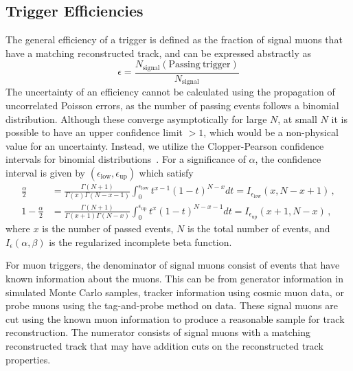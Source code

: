 \subsection{Trigger Efficiencies} \label{sec:kmtf_eff}
The general efficiency of a trigger is defined as the fraction of signal muons that have a matching reconstructed track, and can be expressed abstractly as
\begin{equation}\label{eq:eff}
	\epsilon=\frac{N_\mathrm{signal}(\mathrm{Passing\ trigger})}{N_\mathrm{signal}}	
\end{equation}
The uncertainty of an efficiency cannot be calculated using the propagation of uncorrelated Poisson errors, as the number of passing events follows a binomial distribution. Although these converge asymptotically for large $N$, at small $N$ it is possible to have an upper confidence limit $>1$, which would be a non-physical value for an uncertainty. Instead, we utilize the Clopper-Pearson confidence intervals for binomial distributions~\cite{clopperpearson}. For a significance of $\alpha$, the confidence interval is given by $(\epsilon_\text{low}, \epsilon_\text{up})$ which satisfy
\begin{align}
		\frac{\alpha}{2}&=\frac{\Gamma(N+1)}{\Gamma(x)\Gamma(N-x-1)}\int_{0}^{\epsilon_\text{low}}t^{x-1}(1-t)^{N-x}dt=I_{\epsilon_\text{low}}(x,N-x+1)\,,\\[1em]
		1-\frac{\alpha}{2}&=\frac{\Gamma(N+1)}{\Gamma(x+1)\Gamma(N-x)}\int_{0}^{\epsilon_\text{up}}t^x(1-t)^{N-x-1}dt=I_{\epsilon_\text{up}}(x+1,N-x)\,,
\end{align}
where $x$ is the number of passed events, $N$ is the total number of events, and $I_\epsilon(\alpha,\beta)$ is the regularized incomplete beta function.

For muon triggers, the denominator of signal muons consist of events that have known information about the muons. This can be from generator information in simulated Monte Carlo samples, tracker information using cosmic muon data, or probe muons using the tag-and-probe method on data. These signal muons are cut using the known muon information to produce a reasonable sample for track reconstruction. The numerator consists of signal muons with a matching reconstructed track that may have addition cuts on the reconstructed track properties.


